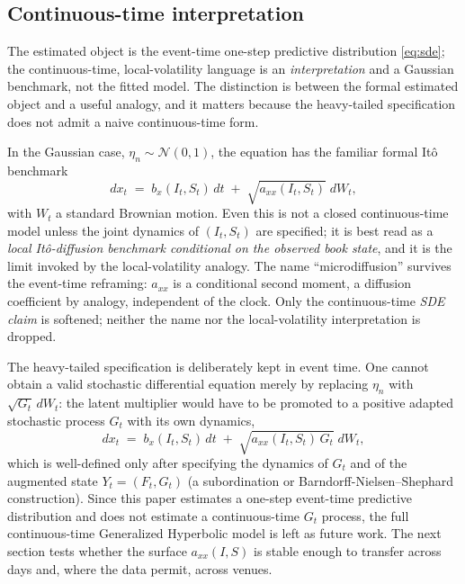 \documentclass[11pt]{article}
\theoremstyle{plain}
\theoremstyle{definition}
\newcommand{\Norm}{\mathcal{N}}
\newcommand{\axx}{a_{xx}}
\begin{document}
\subsection{Continuous-time interpretation}
\label{sub:continuous}

The estimated object is the event-time one-step predictive distribution
\eqref{eq:sde}; the continuous-time, local-volatility language is an
\emph{interpretation} and a Gaussian benchmark, not the fitted model. The distinction
is between the formal estimated object and a useful analogy, and it matters because the
heavy-tailed specification does not admit a naive continuous-time form.

In the Gaussian case, $\eta_n\sim\Norm(0,1)$, the equation has the familiar formal Itô
benchmark
\begin{equation}
  dx_t \;=\; b_x(I_t,S_t)\,dt \;+\; \sqrt{\axx(I_t,S_t)}\;dW_t ,
  \label{eq:sde-cont}
\end{equation}
with $W_t$ a standard Brownian motion. Even this is not a closed continuous-time model
unless the joint dynamics of $(I_t,S_t)$ are specified; it is best read as a
\emph{local It\^o-diffusion benchmark conditional on the observed book state}, and it is
the limit invoked by the local-volatility analogy. The name ``microdiffusion'' survives
the event-time reframing: $\axx$ is a conditional second moment, a diffusion coefficient
by analogy, independent of the clock. Only the continuous-time \emph{SDE claim} is
softened; neither the name nor the local-volatility interpretation is dropped.

The heavy-tailed specification is deliberately kept in event time. One cannot obtain a
valid stochastic differential equation merely by replacing $\eta_n$ with
$\sqrt{G_t}\,dW_t$: the latent multiplier would have to be promoted to a positive
adapted stochastic process $G_t$ with its own dynamics,
\begin{equation}
  dx_t \;=\; b_x(I_t,S_t)\,dt \;+\; \sqrt{\axx(I_t,S_t)\,G_t}\;dW_t ,
  \label{eq:gh-sde}
\end{equation}
which is well-defined only after specifying the dynamics of $G_t$ and of the augmented
state $Y_t=(F_t,G_t)$ (a subordination or Barndorff-Nielsen--Shephard construction).
Since this paper estimates a one-step event-time predictive distribution and does not
estimate a continuous-time $G_t$ process, the full continuous-time Generalized
Hyperbolic model is left as future work. The next section tests whether the surface
$\axx(I,S)$ is stable enough to transfer across days and, where the data permit, across
venues.
\end{document}
